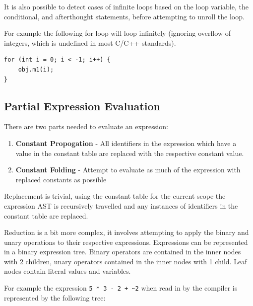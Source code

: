 It is also possible to detect cases of infinite loops based on the loop variable, 
the conditional, and afterthought statements, before attempting to unroll the loop.

For example the following for loop will loop infinitely (ignoring overflow of integers, which is undefined in most C/C++ standards).
\begin{lstlisting}[style=myGPC]
for (int i = 0; i < -1; i++) {
    obj.m1(i);
}
\end{lstlisting}


\subsection{Partial Expression Evaluation}
\label{sub:partial}

There are two parts needed to evaluate an expression:

\begin{enumerate}
    \item \textbf{Constant Propogation}\cite{sccp} - All identifiers in the expression which have a value in the constant table are
          replaced with the respective constant value.

    \item \textbf{Constant Folding}\cite{sccp} - Attempt to evaluate as much of the expression with replaced constants as possible

\end{enumerate}

Replacement is trivial, using the constant table for the current scope the
expression AST is recursively travelled and any instances of identifiers
in the constant table are replaced.


Reduction is a bit more complex, it involves attempting to apply the binary
and unary operations to their respective expressions. Expressions can be
represented in a binary expression tree. Binary operators are contained in
the inner nodes with 2 children, unary operators contained in the inner
nodes with 1 child. Leaf nodes contain literal values and variables.

For example the expression \texttt{5 * 3 - 2 + \textasciitilde2} when read in by the
compiler is represented by the following tree:

